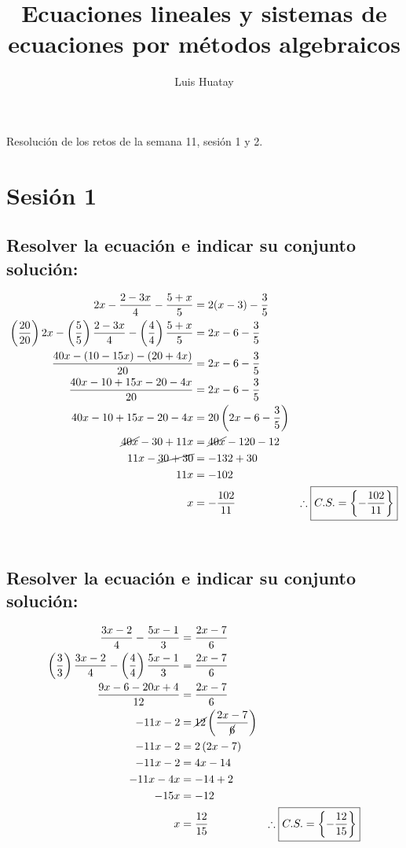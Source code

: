 \documentclass[11pt, a4paper]{article}
\title{\textbf{Ecuaciones lineales y sistemas de ecuaciones por métodos algebraicos}}
\author{Luis Huatay}
\begin{document}
\maketitle
\begin{center}
  Resolución de los retos de la semana 11, sesión 1 y 2.
\end{center}
\restoregeometry

\newpage
{}
\section{Sesión 1}
\subsection{Resolver la ecuación e indicar su conjunto solución:}
\begin{align*}
  2x - \frac{2-3x}{4} - \frac{5+x}{5} &= 2(x-3) - \frac{3}{5}\\
  \left(\frac{20}{20}\right) 2x - \left(\frac{5}{5}\right)\frac{2-3x}{4} - \left(\frac{4}{4}\right) \frac{5+x}{5} &= 2x - 6 - \frac{3}{5}\\
  \frac{40x - \left(10-15x\right) - \left(20+4x\right)}{20} &= 2x - 6 - \frac{3}{5}\\
  \frac{40x - 10 + 15x - 20 - 4x}{20} &= 2x - 6 - \frac{3}{5}\\
  40x - 10 + 15x - 20 - 4x &= 20\left(2x - 6 - \frac{3}{5}\right)\\
  \cancel{40x} - 30 + 11x &= \cancel{40x} - 120 - 12\\
  11x - \cancel{30 + 30} &= -132 +30\\
  11x &= -102\\
  x &= -\frac{102}{11} & \therefore \boxed{C.S. = \left\{-\frac{102}{11}\right\}}
\end{align*}
\\
\subsection{Resolver la ecuación e indicar su conjunto solución:}
\begin{align*}
  \frac{3x-2}{4} - \frac{5x-1}{3} &= \frac{2x-7}{6}\\
  \left(\frac{3}{3}\right)\frac{3x-2}{4} - \left(\frac{4}{4}\right)\frac{5x-1}{3} &= \frac{2x-7}{6}\\
  \frac{9x-6-20x+4}{12} &= \frac{2x-7}{6}\\
  -11x - 2 &= \cancel{12}\left(\frac{2x-7}{\cancel{6}}\right)\\
  -11x - 2 &= 2 \left(2x - 7\right)\\
  -11x - 2 &= 4x - 14\\
  -11x - 4x &= -14 + 2\\
  -15x &= -12\\
  x &= \frac{12}{15} & \therefore \boxed{C.S. = \left\{-\frac{12}{15}\right\}}
\end{align*}
\newpage
\end{document}
